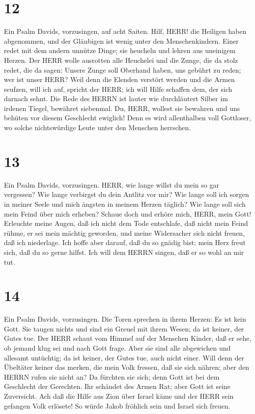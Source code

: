 \hypertarget{section-11}{%
\section{12}\label{section-11}}

 Ein Psalm Davids, vorzusingen, auf acht Saiten. Hilf, HERR!
die Heiligen haben abgenommen, und der Gläubigen ist wenig unter den
Menschenkindern.  Einer redet mit dem andern unnütze Dinge;
sie heucheln und lehren aus uneinigem Herzen.  Der HERR
wolle ausrotten alle Heuchelei und die Zunge, die da stolz redet,
 die da sagen: Unsere Zunge soll Oberhand haben, uns gebührt
zu reden; wer ist unser HERR?  Weil denn die Elenden
verstört werden und die Armen seufzen, will ich auf, spricht der HERR;
ich will Hilfe schaffen dem, der sich darnach sehnt.  Die
Rede des HERRN ist lauter wie durchläutert Silber im irdenen Tiegel,
bewähret siebenmal.  Du, HERR, wollest sie bewahren und uns
behüten vor diesem Geschlecht ewiglich!  Denn es wird
allenthalben voll Gottloser, wo solche nichtswürdige Leute unter den
Menschen herrschen.

\hypertarget{section-12}{%
\section{13}\label{section-12}}

 Ein Psalm Davids, vorzusingen. HERR, wie lange willst du
mein so gar vergessen? Wie lange verbirgst du dein Antlitz vor mir?
 Wie lange soll ich sorgen in meiner Seele und mich ängsten
in meinem Herzen täglich? Wie lange soll sich mein Feind über mich
erheben?  Schaue doch und erhöre mich, HERR, mein Gott!
Erleuchte meine Augen, daß ich nicht dem Tode entschlafe, 
daß nicht mein Feind rühme, er sei mein mächtig geworden, und meine
Widersacher sich nicht freuen, daß ich niederlage.  Ich
hoffe aber darauf, daß du so gnädig bist; mein Herz freut sich, daß du
so gerne hilfst.  Ich will dem HERRN singen, daß er so wohl
an mir tut.

\hypertarget{section-13}{%
\section{14}\label{section-13}}

 Ein Psalm Davids, vorzusingen. Die Toren sprechen in ihrem
Herzen: Es ist kein Gott. Sie taugen nichts und sind ein Greuel mit
ihrem Wesen; da ist keiner, der Gutes tue.  Der HERR schaut
vom Himmel auf der Menschen Kinder, daß er sehe, ob jemand klug sei und
nach Gott frage.  Aber sie sind alle abgewichen und allesamt
untüchtig; da ist keiner, der Gutes tue, auch nicht einer. 
Will denn der Übeltäter keiner das merken, die mein Volk fressen, daß
sie sich nähren; aber den HERRN rufen sie nicht an?  Da
fürchten sie sich; denn Gott ist bei dem Geschlecht der Gerechten.
 Ihr schändet des Armen Rat; aber Gott ist seine Zuversicht.
 Ach daß die Hilfe aus Zion über Israel käme und der HERR
sein gefangen Volk erlösete! So würde Jakob fröhlich sein und Israel
sich freuen.

